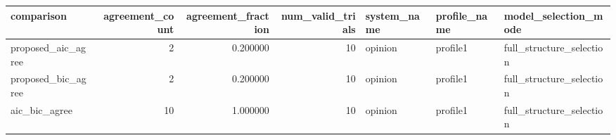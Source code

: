 \begin{tabular}{lrrrlll}
\toprule
comparison & agreement_count & agreement_fraction & num_valid_trials & system_name & profile_name & model_selection_mode \\
\midrule
proposed_aic_agree & 2 & 0.200000 & 10 & opinion & profile1 & full_structure_selection \\
proposed_bic_agree & 2 & 0.200000 & 10 & opinion & profile1 & full_structure_selection \\
aic_bic_agree & 10 & 1.000000 & 10 & opinion & profile1 & full_structure_selection \\
\bottomrule
\end{tabular}
